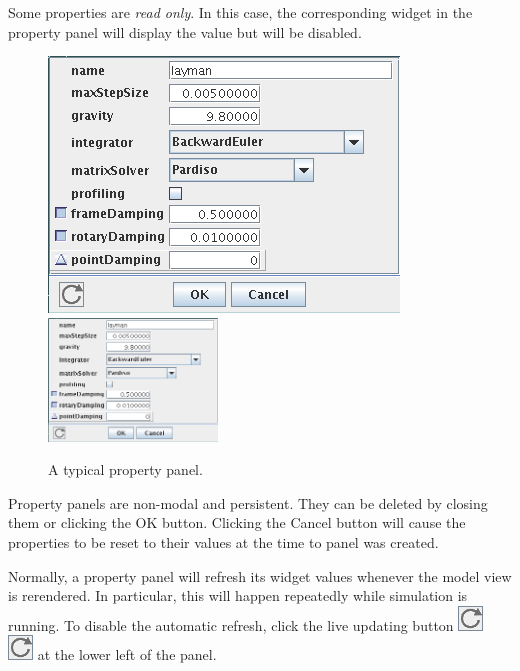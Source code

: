 \documentclass{article}
\begin{document}
Some properties are {\it read only}. In this case, the corresponding
widget in the property panel will display the value but will be
disabled.

\begin{figure}
\begin{center}
\iflatexml
\includegraphics[]{images/propertyPanel}
\else
\includegraphics[width=0.40\textwidth]{images/propertyPanel}
\fi
\end{center}
\caption{A typical property panel.}%
\label{propertyPanelFig}
\end{figure}

Property panels are non-modal and persistent. 
They can be deleted by
closing them or clicking the {\sf OK} button. Clicking the {\sf Cancel} button
will cause the properties to be reset to their values at the time to
panel was created.

Normally, a property panel will refresh its widget values whenever the
model view is rerendered. In particular, this will happen repeatedly
while simulation is running. To disable the automatic refresh, click
the {\sf live updating} button 
\iflatexml
\includegraphics{images/liveUpdateIcon}
\else
\includegraphics[width=.25in]{images/liveUpdateIcon}
\fi
at the lower
left of the panel.
\end{document}
